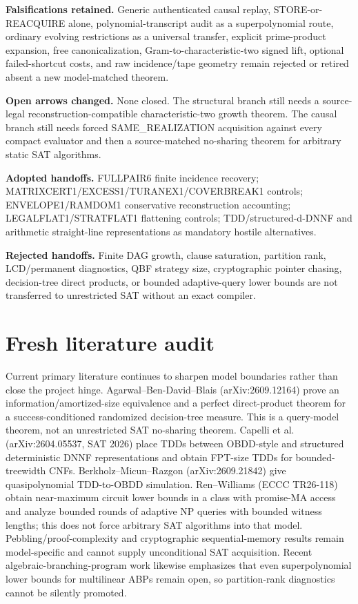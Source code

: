 \documentclass[11pt]{article}
\begin{document}
\textbf{Falsifications retained.} Generic authenticated causal replay, STORE-or-REACQUIRE alone, polynomial-transcript audit as a superpolynomial route, ordinary evolving restrictions as a universal transfer, explicit prime-product expansion, free canonicalization, Gram-to-characteristic-two signed lift, optional failed-shortcut costs, and raw incidence/tape geometry remain rejected or retired absent a new model-matched theorem.

\textbf{Open arrows changed.} None closed. The structural branch still needs a source-legal reconstruction-compatible characteristic-two growth theorem. The causal branch still needs forced SAME_REALIZATION acquisition against every compact evaluator and then a source-matched no-sharing theorem for arbitrary static SAT algorithms.

\textbf{Adopted handoffs.} FULLPAIR6 finite incidence recovery; MATRIXCERT1/EXCESS1/TURANEX1/COVERBREAK1 controls; ENVELOPE1/RAMDOM1 conservative reconstruction accounting; LEGALFLAT1/STRATFLAT1 flattening controls; TDD/structured-d-DNNF and arithmetic straight-line representations as mandatory hostile alternatives.

\textbf{Rejected handoffs.} Finite DAG growth, clause saturation, partition rank, LCD/permanent diagnostics, QBF strategy size, cryptographic pointer chasing, decision-tree direct products, or bounded adaptive-query lower bounds are not transferred to unrestricted SAT without an exact compiler.

\section*{Fresh literature audit}
Current primary literature continues to sharpen model boundaries rather than close the project hinge. Agarwal--Ben-David--Blais (arXiv:2609.12164) prove an information/amortized-size equivalence and a perfect direct-product theorem for a success-conditioned randomized decision-tree measure. This is a query-model theorem, not an unrestricted SAT no-sharing theorem. Capelli et al. (arXiv:2604.05537, SAT 2026) place TDDs between OBDD-style and structured deterministic DNNF representations and obtain FPT-size TDDs for bounded-treewidth CNFs. Berkholz--Micun--Razgon (arXiv:2609.21842) give quasipolynomial TDD-to-OBDD simulation. Ren--Williams (ECCC TR26-118) obtain near-maximum circuit lower bounds in a class with promise-MA access and analyze bounded rounds of adaptive NP queries with bounded witness lengths; this does not force arbitrary SAT algorithms into that model. Pebbling/proof-complexity and cryptographic sequential-memory results remain model-specific and cannot supply unconditional SAT acquisition. Recent algebraic-branching-program work likewise emphasizes that even superpolynomial lower bounds for multilinear ABPs remain open, so partition-rank diagnostics cannot be silently promoted.
\end{document}
